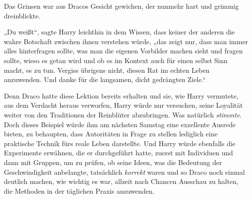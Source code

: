 Das Grinsen war aus Dracos Gesicht gewichen, der nunmehr hart und grimmig dreinblickte.

„Du weißt“, sagte Harry leichthin in dem Wissen, dass keiner der anderen die wahre Botschaft zwischen ihnen verstehen würde, „das zeigt nur, dass man immer alles hinterfragen sollte, was man die eigenen Vorbilder machen sieht und fragen sollte, wieso es getan wird und ob es im Kontext auch für einen selbst Sinn macht, es zu tun. Vergiss übrigens nicht, diesen Rat im echten Leben anzuwenden. Und danke für die langsamen, dicht gedrängten Ziele.“

Denn Draco hatte diese Lektion bereits erhalten und sie, wie Harry vermutete, aus dem Verdacht heraus verworfen, Harry würde nur versuchen, seine Loyalität weiter von den Traditionen der Reinblüter abzubringen. Was natürlich \emph{stimmte}. Doch dieses Beispiel würde ihm am nächsten Samstag eine exzellente Ausrede bieten, zu behaupten, dass Autoritäten in Frage zu stellen lediglich eine praktische Technik fürs reale Leben darstellte. Und Harry würde ebenfalls die Experimente erwähnen, die er durchgeführt hatte, zuerst mit Individuen und dann mit Gruppen, um zu prüfen, ob seine Ideen, was die Bedeutung der Geschwindigkeit anbelangte, tatsächlich \emph{korrekt} waren und so Draco noch einmal deutlich machen, wie wichtig es war, allzeit nach Chancen Ausschau zu halten, die Methoden in der täglichen Praxis anzuwenden.

